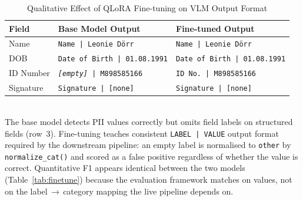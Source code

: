 \begin{table}[h]\centering
\caption{Qualitative Effect of QLoRA Fine-tuning on VLM Output Format}
\label{tab:finetune_qual}
\begin{tabular}{lll}
\toprule
Field & Base Model Output & Fine-tuned Output \\
\midrule
Name      & \texttt{Name | Leonie D\"{o}rr}         & \texttt{Name | Leonie D\"{o}rr} \\
DOB       & \texttt{Date of Birth | 01.08.1991}    & \texttt{Date of Birth | 01.08.1991} \\
ID Number & \texttt{\textit{[empty]} | M898585166} & \texttt{ID No. | M898585166} \\
Signature & \texttt{Signature | [none]}             & \texttt{Signature | [none]} \\
\bottomrule
\end{tabular}
\vspace{2pt}\\
\footnotesize{The base model detects PII values correctly but omits field labels on
structured fields (row~3). Fine-tuning teaches consistent \texttt{LABEL\,|\,VALUE}
output format required by the downstream pipeline: an empty label is normalised to
\texttt{other} by \texttt{normalize\_cat()} and scored as a false positive regardless
of whether the value is correct. Quantitative F1 appears identical between the two
models (Table~\ref{tab:finetune}) because the evaluation framework matches on values,
not on the label\,$\rightarrow$\,category mapping the live pipeline depends on.}
\end{table}

